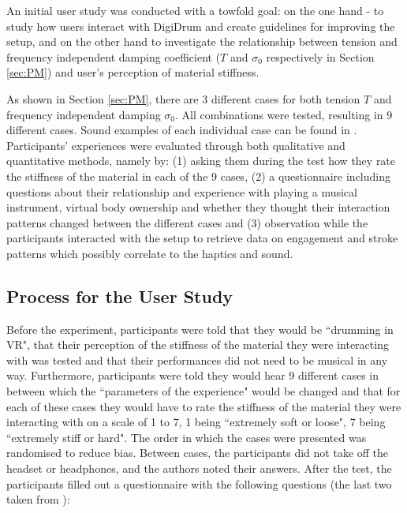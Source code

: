     An initial user study was conducted with a towfold goal: on the one hand - to study how users interact with DigiDrum and create guidelines for improving the setup, and on the other hand to investigate the relationship between tension and frequency independent damping coefficient ($T$ and $\sigma_0$ respectively in Section \ref{sec:PM}) and user's perception of material stiffness.
    
    As shown in Section \ref{sec:PM}, there are 3 different cases for both tension $T$ and frequency independent damping $\sigma_0$. All combinations were tested, resulting in 9 different cases. Sound examples of each individual case can be found in \cite{soundfiles}. Participants' experiences were evaluated through both qualitative and quantitative methods, namely by: (1) asking them during the test how they rate the stiffness of the material in each of the 9 cases, (2) a questionnaire including questions about their relationship and experience with playing a musical instrument, virtual body ownership and whether they thought their interaction patterns changed between the different cases and (3) observation while the participants interacted with the setup to retrieve data on engagement and stroke patterns which possibly correlate to the haptics and sound.
    
    \subsection{Process for the User Study}
    Before the experiment, participants were told that they would be ``drumming in VR", that their perception of the stiffness of the material they were interacting with was tested and that their performances did not need to be musical in any way. Furthermore, participants were told they would hear 9 different cases in between which the ``parameters of the experience" would be changed and that for each of these cases they would have to rate the stiffness of the material they were interacting with on a scale of 1 to 7, 1 being ``extremely soft or loose", 7 being ``extremely stiff or hard". The order in which the cases were presented was randomised to reduce bias. Between cases, the participants did not take off the headset or headphones, and the authors noted their answers. After the test, the participants filled out a questionnaire with the following questions (the last two taken from \cite{avanzini2006}):
    
